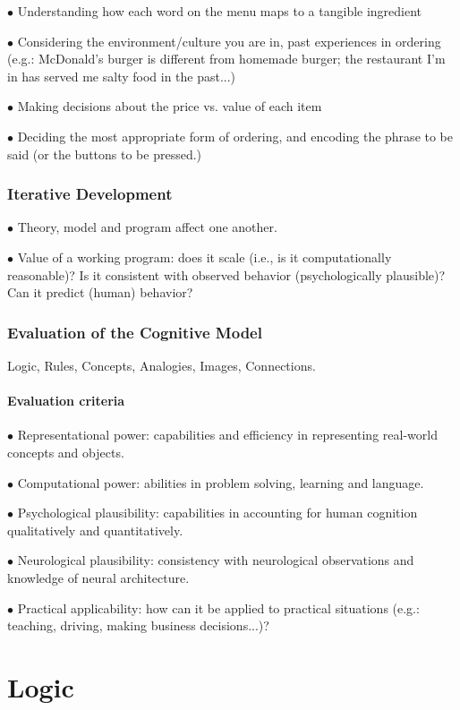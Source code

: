 \documentclass[english,openany]{book}
\begin{document}
$\bullet$ Understanding how each word on the menu maps to a tangible ingredient

$\bullet$ Considering the environment/culture you are in, past experiences in ordering (e.g.: McDonald's burger is different from homemade burger; the restaurant I'm in has served me salty food in the past...)

$\bullet$ Making decisions about the price vs. value of each item

$\bullet$ Deciding the most appropriate form of ordering, and encoding the phrase to be said (or the buttons to be pressed.)

\subsection{Iterative Development}

$\bullet$ Theory, model and program affect one another.

$\bullet$ Value of a working program: does it scale (i.e., is it computationally reasonable)? Is it consistent with observed behavior (psychologically plausible)? Can it predict (human) behavior?

\subsection{Evaluation of the Cognitive Model}

Logic, Rules, Concepts, Analogies, Images, Connections.

\subsubsection{Evaluation criteria}

$\bullet$ Representational power: capabilities and efficiency in representing real-world concepts and objects.

$\bullet$ Computational power: abilities in problem solving, learning and language.

$\bullet$ Psychological plausibility: capabilities in accounting for human cognition qualitatively and quantitatively.

$\bullet$ Neurological plausibility: consistency with neurological observations and knowledge of neural architecture. 

$\bullet$ Practical applicability: how can it be applied to practical situations (e.g.: teaching, driving, making business decisions...)?

\chapter{Logic}
\end{document}
